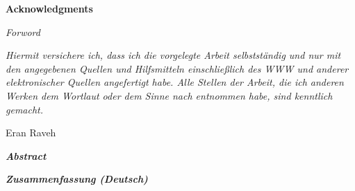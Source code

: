 \vspace*{9cm}
\begin{center}
\end{center}
\newpage

\vspace*{3cm}
\begin{center}
    {\textbf{\huge Acknowledgments}}\\[0.3cm]
    \Large
\end{center}
\newpage

{\calligra \Huge \textit{Forword}}
\clearpage        

\begin{multicols}{2}
    \vspace*{\textheight}
    \columnbreak
    \vspace*{3cm}
    \Large{\textit{Hiermit versichere ich, dass ich die vorgelegte Arbeit selbstst{\"a}ndig und nur mit den angegebenen Quellen und Hilfsmitteln einschließlich des WWW und anderer elektronischer Quellen angefertigt habe.
            Alle Stellen der Arbeit, die ich anderen Werken dem Wortlaut oder dem Sinne nach entnommen habe, sind kenntlich gemacht.}}
    \vspace{0.55cm}
    \begin{flushright}
		{Eran Raveh}
    \end{flushright}
\end{multicols}
\cleardoublepage

\begin{center}
    \vspace*{3.3cm}
    \textit{\textbf{\huge Abstract}}\\[0.3cm]
    \Large
\end{center}
\clearpage

 \begin{center}
     \vspace*{3.3cm}
     \textit{\textbf{\huge Zusammenfassung (Deutsch)}}\\[0.3cm]
     \Large
\end{center}
\cleardoublepage


